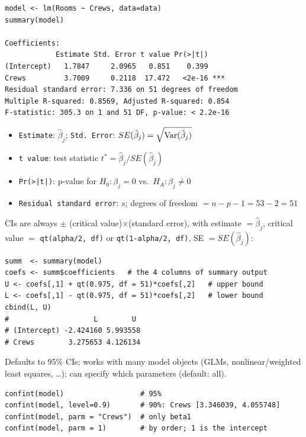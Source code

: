 \begin{example}
\begin{verbatim}
model <- lm(Rooms ~ Crews, data=data)
summary(model)

Coefficients:
            Estimate Std. Error t value Pr(>|t|)
(Intercept)   1.7847     2.0965   0.851    0.399
Crews         3.7009     0.2118  17.472   <2e-16 ***
Residual standard error: 7.336 on 51 degrees of freedom
Multiple R-squared: 0.8569, Adjusted R-squared: 0.854
F-statistic: 305.3 on 1 and 51 DF, p-value: < 2.2e-16
\end{verbatim}
    \begin{itemize}
        \item \texttt{Estimate}: $\hat\beta_j$; \texttt{Std.\ Error}: $SE(\hat\beta_j)=\sqrt{\operatorname{Var}(\hat\beta_j)}$
        \item \texttt{t value}: test statistic $t^*=\hat\beta_j/SE(\hat\beta_j)$
        \item \texttt{Pr(>|t|)}: p-value for $H_0:\beta_j=0$ vs.\ $H_A:\beta_j\neq0$
        \item \texttt{Residual standard error}: $s$; degrees of freedom $=n-p-1=53-2=51$
    \end{itemize}
\end{example}

\begin{example}
    CIs are always  $\pm$ (critical value)$\times$(standard error), with
    estimate $=\hat\beta_j$, critical value $=$ \texttt{qt(alpha/2, df)} or
    \texttt{qt(1-alpha/2, df)}, SE $=SE(\hat\beta_j)$:
\begin{verbatim}
summ  <- summary(model)
coefs <- summ$coefficients   # the 4 columns of summary output
U <- coefs[,1] + qt(0.975, df = 51)*coefs[,2]   # upper bound
L <- coefs[,1] - qt(0.975, df = 51)*coefs[,2]   # lower bound
cbind(L, U)
#                    L        U
# (Intercept) -2.424160 5.993558
# Crews        3.275653 4.126134
\end{verbatim}
\end{example}

\begin{example}
    Defaults to 95\% CIs; works with many model objects (GLMs, nonlinear/weighted least
    squares, \dots); can specify which parameters (default: all).
\begin{verbatim}
confint(model)                  # 95%
confint(model, level=0.9)       # 90%: Crews [3.346039, 4.055748]
confint(model, parm = "Crews")  # only beta1
confint(model, parm = 1)        # by order; 1 is the intercept
\end{verbatim}
\end{example}


